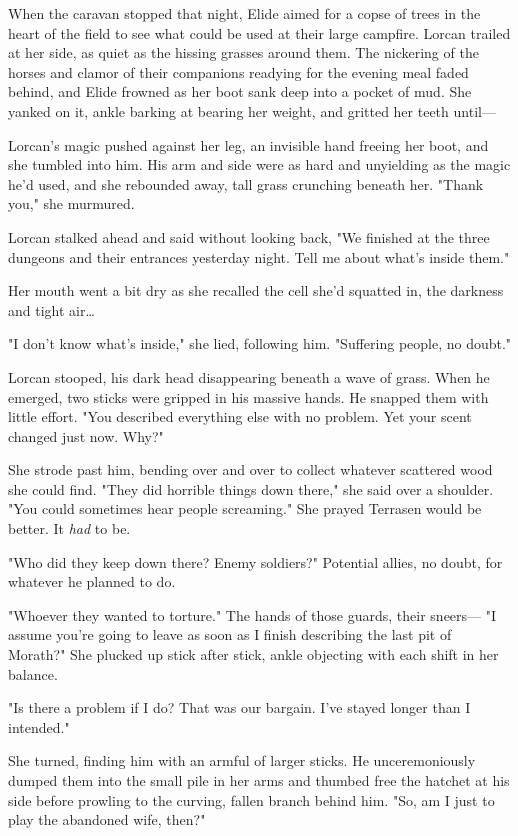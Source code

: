 When the caravan stopped that night, Elide aimed for a copse of trees in the heart of the field to see what could be used at their large campfire. Lorcan trailed at her side, as quiet as the hissing grasses around them. The nickering of the horses and clamor of their companions readying for the evening meal faded behind, and Elide frowned as her boot sank deep into a pocket of mud. She yanked on it, ankle barking at bearing her weight, and gritted her teeth until---

Lorcan's magic pushed against her leg, an invisible hand freeing her boot, and she tumbled into him. His arm and side were as hard and unyielding as the magic he'd used, and she rebounded away, tall grass crunching beneath her. "Thank you," she murmured.

Lorcan stalked ahead and said without looking back, "We finished at the three dungeons and their entrances yesterday night. Tell me about what's inside them."

Her mouth went a bit dry as she recalled the cell she'd squatted in, the darkness and tight air\ldots{}

"I don't know what's inside," she lied, following him. "Suffering people, no doubt."

Lorcan stooped, his dark head disappearing beneath a wave of grass. When he emerged, two sticks were gripped in his massive hands. He snapped them with little effort. "You described everything else with no problem. Yet your scent changed just now. Why?"

She strode past him, bending over and over to collect whatever scattered wood she could find. "They did horrible things down there," she said over a shoulder. "You could sometimes hear people screaming." She prayed Terrasen would be better. It \emph{had} to be.

"Who did they keep down there? Enemy soldiers?" Potential allies, no doubt, for whatever he planned to do.

"Whoever they wanted to torture." The hands of those guards, their sneers--- "I assume you're going to leave as soon as I finish describing the last pit of Morath?" She plucked up stick after stick, ankle objecting with each shift in her balance.

"Is there a problem if I do? That was our bargain. I've stayed longer than I intended."

She turned, finding him with an armful of larger sticks. He unceremoniously dumped them into the small pile in her arms and thumbed free the hatchet at his side before prowling to the curving, fallen branch behind him. "So, am I just to play the abandoned wife, then?"


